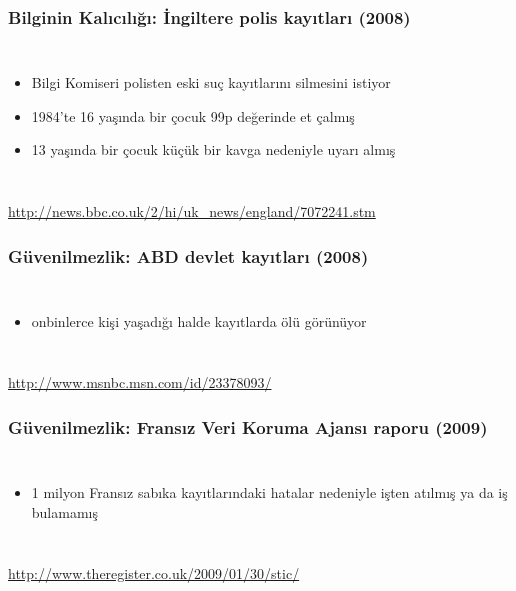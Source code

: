 \documentclass[dvipsnames]{beamer}
\theoremstyle{definition}
\theoremstyle{example}
\theoremstyle{plain}
\begin{document}
\begin{frame}
  \frametitle{Bilginin Kalıcılığı: İngiltere polis kayıtları (2008)}

  \begin{columns}

    \begin{itemize}
      \item Bilgi Komiseri polisten eski suç kayıtlarını silmesini istiyor

      \medskip
      \item 1984'te 16 yaşında bir çocuk 99p değerinde et çalmış
      \item 13 yaşında bir çocuk küçük bir kavga nedeniyle uyarı almış
    \end{itemize}
  \end{columns}

  \medskip
  \tiny{\url{http://news.bbc.co.uk/2/hi/uk_news/england/7072241.stm}}
\end{frame}

\begin{frame}
  \frametitle{Güvenilmezlik: ABD devlet kayıtları (2008)}

  \begin{columns}

    \begin{itemize}
      \item onbinlerce kişi yaşadığı halde kayıtlarda ölü görünüyor
    \end{itemize}
  \end{columns}

  \medskip
  \tiny{\url{http://www.msnbc.msn.com/id/23378093/}}
\end{frame}

\begin{frame}
  \frametitle{Güvenilmezlik: Fransız Veri Koruma Ajansı raporu (2009)}

  \begin{columns}

    \begin{itemize}
      \item 1 milyon Fransız sabıka kayıtlarındaki hatalar nedeniyle işten
        atılmış ya da iş bulamamış
    \end{itemize}
  \end{columns}

  \medskip
  \tiny{\url{http://www.theregister.co.uk/2009/01/30/stic/}}
\end{frame}
\end{document}
